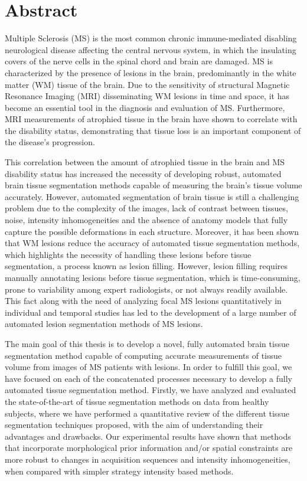 \chapter*{Abstract}


Multiple Sclerosis (MS)  is the most common chronic immune-mediated disabling neurological disease affecting the central nervous system, in which the insulating covers of the nerve cells in the spinal chord and brain are damaged. MS is characterized by the presence of lesions in the brain, predominantly in the white matter (WM) tissue of the brain. Due to the sensitivity of structural Magnetic Resonance Imaging (MRI) disseminating WM lesions in time and space, it has become an essential tool in the diagnosis and evaluation of MS. Furthermore, MRI measurements of atrophied tissue in the brain have shown to correlate with the disability status, demonstrating that tissue loss is an important component of the disease's progression. 

This correlation between the amount of atrophied tissue in the brain and MS disability status has increased the necessity of developing robust, automated brain tissue segmentation methods capable of measuring the brain's tissue volume accurately. However, automated segmentation of brain tissue is still a challenging problem due to the complexity of the images, lack of contrast between tissues, noise, intensity inhomogeneities and the absence of anatomy models that fully capture the possible deformations in each structure. Moreover, it has been shown that WM lesions reduce the accuracy of automated tissue segmentation methods, which highlights the necessity of handling these lesions before tissue segmentation, a process known as lesion filling. However, lesion filling requires manually annotating lesions before tissue segmentation, which is time-consuming, prone to variability among expert radiologists, or not always readily available. This fact along with the need of analyzing focal MS lesions quantitatively in individual and temporal studies has led to the development of a large number of automated lesion segmentation methods of MS lesions. 

The main goal of this thesis is to develop a novel, fully automated brain tissue segmentation method capable of computing accurate measurements of tissue volume from images of MS patients with lesions. In order to fulfill this goal, we have focused on each of the concatenated processes necessary to develop a fully automated tissue segmentation method. Firstly, we have analyzed and evaluated the state-of-the-art of tissue segmentation methods on data from healthy subjects, where we have performed a quantitative review of the different  tissue segmentation techniques proposed, with the aim of understanding their advantages and drawbacks. Our experimental results have shown that methods that incorporate morphological prior information and/or spatial constraints are more robust to changes in acquisition sequences and intensity inhomogeneities, when compared with simpler strategy intensity based methods.   

